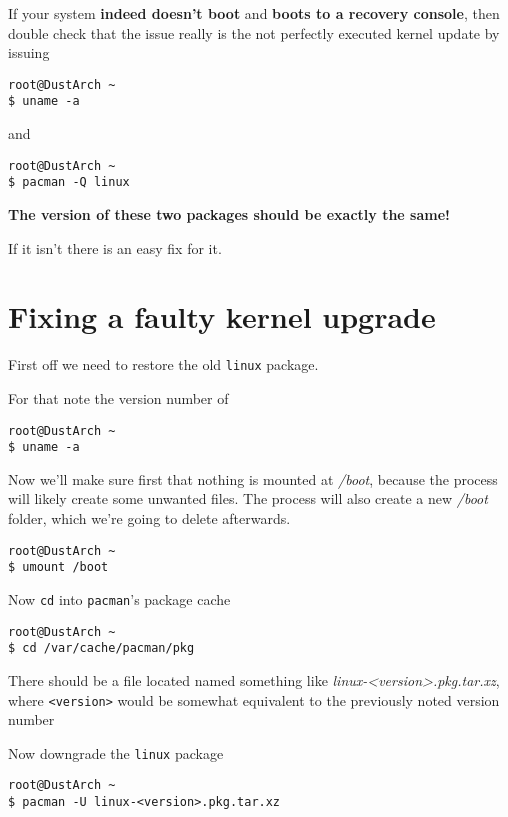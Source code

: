 \documentclass[9pt]{report}
\begin{document}
If your system \textbf{indeed doesn’t boot} and \textbf{boots to a recovery console}, then double check that the issue really is the not perfectly executed kernel update by issuing


\begin{verbatim}
root@DustArch ~
$ uname -a
\end{verbatim}

and


\begin{verbatim}
root@DustArch ~
$ pacman -Q linux
\end{verbatim}

\textbf{The version of these two packages should be exactly the same!}

If it isn’t there is an easy fix for it.

\newpage

\hypertarget{x-fixing-a-faulty-kernel-upgrade}{\section{Fixing a faulty kernel upgrade}}
First off we need to restore the old \texttt{linux} package.


For that note the version number of


\begin{verbatim}
root@DustArch ~
$ uname -a
\end{verbatim}

Now we’ll make sure first that nothing is mounted at \textit{/boot}, because the process will likely create some unwanted files.
The process will also create a new \textit{/boot} folder, which we’re going to delete afterwards.


\begin{verbatim}
root@DustArch ~
$ umount /boot
\end{verbatim}

Now \texttt{cd} into \texttt{pacman}'s package cache


\begin{verbatim}
root@DustArch ~
$ cd /var/cache/pacman/pkg
\end{verbatim}

There should be a file located named something like \textit{linux-<version>.pkg.tar.xz}, where \texttt{<version>} would be somewhat equivalent to the previously noted version number


Now downgrade the \texttt{linux} package


\begin{verbatim}
root@DustArch ~
$ pacman -U linux-<version>.pkg.tar.xz
\end{verbatim}
\end{document}
